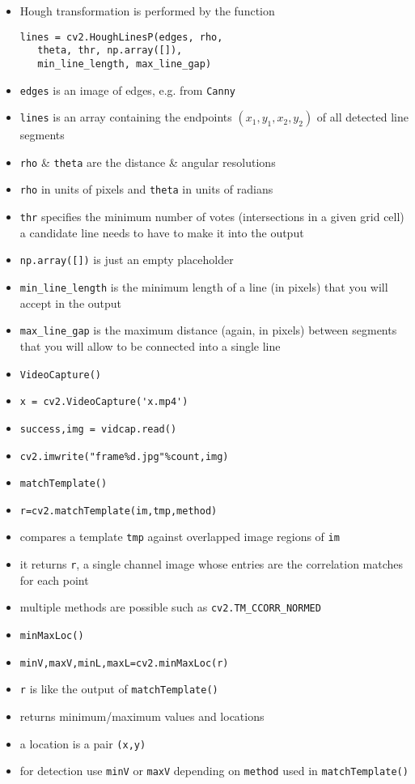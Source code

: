 \documentclass[onecolumn]{IEEEtran} %
\begin{document}
\begin{itemize}
    \bi
        \item Hough transformation is performed by the function
        \begin{verbatim}
lines = cv2.HoughLinesP(edges, rho,
   theta, thr, np.array([]),
   min_line_length, max_line_gap)
        \end{verbatim}
        \item \verb|edges| is an image of edges, e.g. from \verb|Canny|
        \item \verb|lines| is an array containing the endpoints $(x_1, y_1, x_2, y_2)$ of all detected line segments
        \item \verb|rho| \& \verb|theta| are the distance \& angular resolutions
        \bi
            \item \verb|rho| in units of pixels and \verb|theta| in units of radians
        \ei
        \item \verb|thr| specifies the minimum number of votes (intersections in a given grid cell) a candidate line needs to have to make it into the output
        \item \verb|np.array([])| is just an empty placeholder
        \item \verb|min_line_length| is the minimum length of a line (in pixels) that you will accept in the output
        \item \verb|max_line_gap| is the maximum distance (again, in pixels) between segments that you will allow to be connected into a single line
    \ei
    \item \verb|VideoCapture()|
    \bi
        \item \verb|x = cv2.VideoCapture('x.mp4')|
        \item \verb|success,img = vidcap.read()|
        \item \verb|cv2.imwrite("frame%d.jpg"%count,img)|
    \ei
    \item \verb|matchTemplate()|
    \bi
        \item \verb|r=cv2.matchTemplate(im,tmp,method)|
        \item compares a template \verb|tmp| against overlapped image regions of \verb|im|
        \item it returns \verb|r|, a single channel image whose entries are the correlation matches for each point
        \item multiple methods are possible such as \verb|cv2.TM_CCORR_NORMED|
    \ei
    \item \verb|minMaxLoc()|
    \bi
        \item \verb|minV,maxV,minL,maxL=cv2.minMaxLoc(r)|
        \item \verb|r| is like the output of \verb|matchTemplate()|
        \item returns minimum/maximum values and locations
        \item a location is a pair \verb|(x,y)|
        \item for detection use \verb|minV| or \verb|maxV| depending on \verb|method| used in \verb|matchTemplate()|
    \ei
\end{itemize}
\end{document}
